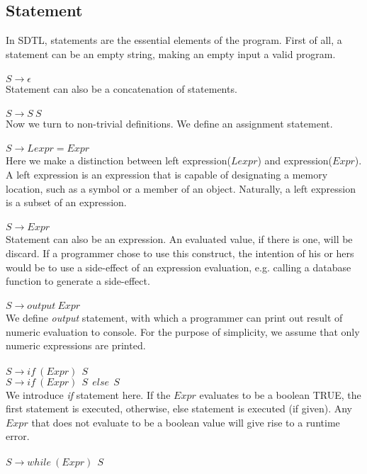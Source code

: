 \documentclass[a4paper,12pt]{article}
\begin{document}
\subsection{Statement}
In SDTL, statements are the essential elements of the program. First of all, a statement can be an empty string, making an empty input a valid program.\\\\
$S \rightarrow \epsilon$\\
Statement can also be a concatenation of statements.\\\\
$S \rightarrow S\  S$\\
Now we turn to non-trivial definitions. We define an assignment statement.\\\\
$S \rightarrow Lexpr = Expr$\\
Here we make a distinction between left expression($Lexpr$) and expression($Expr$). A left expression is an expression that is capable of designating a memory location, such as a symbol or a member of an object. Naturally, a left expression is a subset of an expression.\\\\
$S \rightarrow Expr$\\
Statement can also be an expression. An evaluated value, if there is one, will be discard. If a programmer chose to use this construct, the intention of his or hers would be to use a side-effect of an expression evaluation, e.g. calling a database function to generate a side-effect.\\\\
$S \rightarrow output\  Expr$\\
We define \textit{output} statement, with which a programmer can print out result of numeric evaluation to console. For the purpose of simplicity, we assume that only numeric expressions are printed.\\\\
$S \rightarrow if\ (Expr)\ {\ S\ }$\\
$S \rightarrow if\ (Expr)\ {\ S\ }\ else\ {\ S\ }$\\
We introduce \textit{if} statement here. If the $Expr$ evaluates to be a boolean TRUE, the first statement is executed, otherwise, else statement is executed (if given). Any $Expr$ that does not evaluate to be a boolean value will give rise to a runtime error.\\\\
$S \rightarrow while\ (Expr)\ {\ S\ }$
\end{document}
